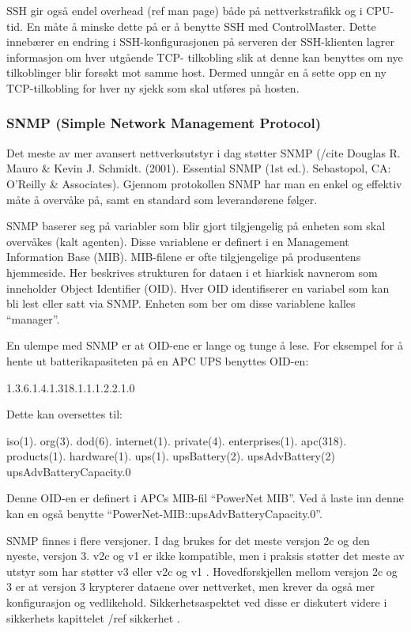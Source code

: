 SSH gir også endel overhead (ref man page) både på nettverkstrafikk og i CPU-tid. En måte å minske dette på er å benytte SSH med ControlMaster. Dette innebærer en endring i SSH-konfigurasjonen på serveren der SSH-klienten lagrer informasjon om hver utgående TCP- tilkobling slik at denne kan benyttes om nye tilkoblinger blir forsøkt mot samme host. Dermed unngår en å sette opp en ny TCP-tilkobling for hver ny sjekk som skal utføres på hosten.  

\subsubsection{SNMP (Simple Network Management Protocol)}

Det meste av mer avansert nettverksutstyr i dag støtter SNMP (/cite Douglas R. Mauro \& Kevin J. Schmidt. (2001). Essential SNMP (1st ed.). Sebastopol, CA: O’Reilly \& Associates). Gjennom protokollen SNMP har man en enkel og effektiv måte å overvåke på, samt en standard som leverandørene følger. 

SNMP baserer seg på variabler som blir gjort tilgjengelig på enheten som skal overvåkes (kalt agenten). Disse variablene er definert i en Management Information Base (MIB). MIB-filene er ofte tilgjengelige på produsentens hjemmeside. Her beskrives strukturen for dataen i et hiarkisk navnerom som inneholder Object Identifier (OID). Hver OID identifiserer en variabel som kan bli lest eller satt via SNMP. Enheten som ber om disse variablene kalles “manager”. 

En ulempe med SNMP er at OID-ene er lange og tunge å lese. For eksempel for å hente ut batterikapasiteten på en APC UPS benyttes OID-en:

1.3.6.1.4.1.318.1.1.1.2.2.1.0

Dette kan oversettes til:

iso(1). org(3). dod(6). internet(1). private(4). enterprises(1). apc(318). products(1). hardware(1). ups(1). upsBattery(2). upsAdvBattery(2) upsAdvBatteryCapacity.0

Denne OID-en er definert i APCs MIB-fil “PowerNet MIB”. Ved å laste inn denne kan en også benytte “PowerNet-MIB::upsAdvBatteryCapacity.0”.

SNMP finnes i flere versjoner. I dag brukes for det meste versjon 2c og den nyeste, versjon 3. v2c og v1 er ikke kompatible, men i praksis støtter det meste av utstyr som har støtter v3 eller v2c og v1 \cite{rfc3584}. Hovedforskjellen mellom versjon 2c og 3 er at versjon 3 krypterer dataene over nettverket, men krever da også mer konfigurasjon og vedlikehold. Sikkerhetsaspektet ved disse er diskutert videre i sikkerhets kapittelet /ref sikkerhet . 

